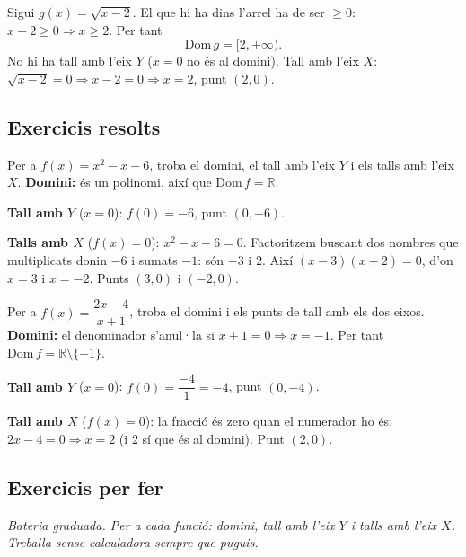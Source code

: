 \begin{exemple}
Sigui $g(x)=\sqrt{x-2}$. El que hi ha dins l'arrel ha de ser $\ge 0$:
$x-2\ge 0 \Rightarrow x\ge 2$. Per tant
\[
\mathrm{Dom}\,g=[2,+\infty).
\]
No hi ha tall amb l'eix $Y$ ($x=0$ no és al domini). Tall amb l'eix $X$:
$\sqrt{x-2}=0 \Rightarrow x-2=0 \Rightarrow x=2$, punt $(2,0)$.
\end{exemple}

\subsection{Exercicis resolts}

\begin{exresolt}
Per a $f(x)=x^2-x-6$, troba el domini, el tall amb l'eix $Y$ i els talls amb l'eix
$X$.
\solucio
\textbf{Domini:} és un polinomi, així que $\mathrm{Dom}\,f=\mathbb{R}$.

\textbf{Tall amb $Y$} ($x=0$): $f(0)=-6$, punt $(0,-6)$.

\textbf{Talls amb $X$} ($f(x)=0$): $x^2-x-6=0$. Factoritzem buscant dos nombres que
multiplicats donin $-6$ i sumats $-1$: són $-3$ i $2$. Així $(x-3)(x+2)=0$, d'on
$x=3$ i $x=-2$. Punts $(3,0)$ i $(-2,0)$.
\end{exresolt}

\begin{exresolt}
Per a $f(x)=\dfrac{2x-4}{x+1}$, troba el domini i els punts de tall amb els dos eixos.
\solucio
\textbf{Domini:} el denominador s'anul·la si $x+1=0 \Rightarrow x=-1$. Per tant
$\mathrm{Dom}\,f=\mathbb{R}\setminus\{-1\}$.

\textbf{Tall amb $Y$} ($x=0$): $f(0)=\dfrac{-4}{1}=-4$, punt $(0,-4)$.

\textbf{Tall amb $X$} ($f(x)=0$): la fracció és zero quan el numerador ho és:
$2x-4=0 \Rightarrow x=2$ (i $2$ sí que és al domini). Punt $(2,0)$.
\end{exresolt}

\subsection{Exercicis per fer}

\noindent\textit{Bateria graduada. Per a cada funció: domini, tall amb l'eix $Y$ i
talls amb l'eix $X$. Treballa sense calculadora sempre que puguis.}

